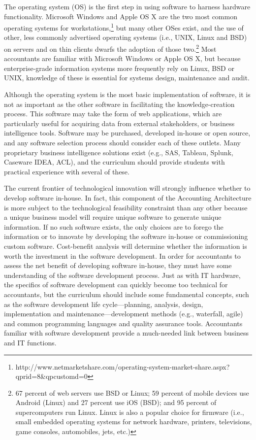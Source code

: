 \documentclass[12pt]{article}
\begin{document}
The operating system (OS) is the first step in using software to harness hardware functionality. Microsoft Windows and Apple OS X are the two most common operating systems for workstations,\footnote{http://www.netmarketshare.com/operating-system-market-share.aspx?qprid=8\&qpcustomd=0}  but many other OSes exist, and the use of other, less commonly advertised operating systems (i.e., UNIX, Linux and BSD) on servers and on thin clients dwarfs the adoption of those two.\footnote{67 percent of web servers use BSD or Linux; 59 percent of mobile devices use Android (Linux) and 27 percent use iOS (BSD); and 95 percent of supercomputers run Linux. Linux is also a popular choice for firmware (i.e., small embedded operating systems for network hardware, printers, televisions, game consoles, automobiles, jets, etc.)} Most accountants are familiar with Microsoft Windows or Apple OS X, but because enterprise-grade information systems more frequently rely on Linux, BSD or UNIX, knowledge of these is essential for systems design, maintenance and audit.

Although the operating system is the most basic implementation of software, it is not as important as the other software in facilitating the knowledge-creation process. This software may take the form of web applications, which are particularly useful for acquiring data from external stakeholders, or business intelligence tools. Software may be purchased, developed in-house or open source, and any software selection process should consider each of these outlets. Many proprietary business intelligence solutions exist (e.g., SAS, Tableau, Splunk, Caseware IDEA, ACL), and the curriculum should provide students with practical experience with several of these.

The current frontier of technological innovation will strongly influence whether to develop software in-house. In fact, this component of the Accounting Architecture is more subject to the technological feasibility constraint than any other because a unique business model will require unique software to generate unique information. If no such software exists, the only choices are to forego the information or to innovate by developing the software in-house or commissioning custom software. Cost-benefit analysis will determine whether the information is worth the investment in the software development. In order for accountants to assess the net benefit of developing software in-house, they must have some understanding of the software development process. Just as with IT hardware, the specifics of software development can quickly become too technical for accountants, but the curriculum should include some fundamental concepts, such as the software development life cycle---planning, analysis, design, implementation and maintenance---development methods (e.g., waterfall, agile) and common programming languages and quality assurance tools. Accountants familiar with software development provide a much-needed link between business and IT functions.
\end{document}
